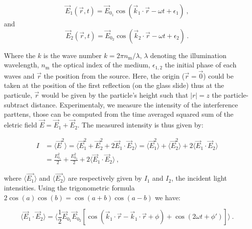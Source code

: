 \begin{equation}
	\vec{E}_1(\vec{r}, t) = \vec{E}_{0_1} \cos(\vec{k}_1 \cdot \vec{r} - \omega t + \epsilon_1) ~,
\end{equation}
and
\begin{equation}
	\vec{E}_2(\vec{r}, t) = \vec{E}_{0_2} \cos (\vec{k}_2 \cdot \vec{r} - \omega t + \epsilon_2) ~.
\end{equation}



Where the $k$ is the wave number $k=2\pi n_{\mathrm{m}}/\lambda$, $\lambda$ denoting the illumination wavelength, $n_\mathrm{m}$ the optical index of the medium, $\epsilon_{1,2}$ the initial phase of each waves and $\vec{r}$ the position from the source. Here, the origin ($\vec{r} = \vec{0}$) could be taken at the position of the first reflection (on the glass slide) thus at the particule, $\vec{r}$ would be given by the particle's height such that $|r| = z$ the particle-subtract distance. Experimentaly, we measure the intensity of the interference parttens, those can be computed from the time averaged squared sum of the eletric field $\vec{E} = \vec{E}_1 + \vec{E}_2$. The measured intensity is thus given by:

\begin{equation}
	\begin{aligned}
		I & = \langle \vec{E}^2 \rangle = \langle \vec{E}_1^2 + \vec{E}_2^2 + 2\vec{E}_1 \cdot \vec{E}_2 \rangle 
		= \langle \vec{E}_1^2 \rangle + \langle \vec{E}_2^2 \rangle  + 2 \langle \vec{E}_1 \cdot \vec{E}_2 \rangle \\
		& = \frac{{E_{0_1}^2}}{2} + \frac{{E_{0_2}^2}}{2} +  2 \langle \vec{E}_1 \cdot \vec{E}_2 \rangle ~,
	\end{aligned}
\end{equation} 

where $ \langle \vec{E_1} \rangle $ and  $\langle \vec{E_2} \rangle$ are respectively given by $I_1$ and $I_2$, the incident light intensities. Using the trigonometric formula $2 \cos (a)\cos (b) = \cos (a+b) \cos (a-b) $ we have:

\begin{equation}
	\langle  
	\vec{E}_1 \cdot \vec{E}_2 \rangle = 
	\langle
	\frac{1}{2} \vec{E}_{0_1}  \vec{E}_{0_2} 
	\left[
		\cos 
		\left(
			\vec{k}_1 \cdot \vec{r} - \vec{k}_1 \cdot \vec{r} + \phi	
		\right)	
		+ 
		\cos
		\left(
			2\omega t + \phi'
		\right)
	\right]
	\rangle~.
\end{equation}

